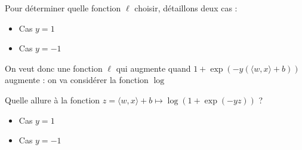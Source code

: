 \documentclass[10pt]{beamer}
\begin{document}
\begin{frame}
	Pour déterminer quelle fonction $\ell$ choisir, détaillons deux cas :\\[1em]
	
	\begin{itemize}
		\item Cas $y=1$\\[10em]
		
		\item Cas $y=-1$\\[9em]
	\end{itemize}
	On veut donc une fonction $\ell$ qui augmente quand $\displaystyle 1+ \exp\left(-y\left(\langle w,x\rangle +b\right)\right)$ augmente : on va considérer la fonction $\log$
\end{frame}



\begin{frame}
Quelle allure à la fonction $z =\langle w,x\rangle +b \mapsto \log\left(1+ \exp\left(-yz\right)\right)$ ?\\[1em]
\begin{itemize}
	\item Cas $y=1$   \\[11em]
	
	\item Cas $y=-1$\\[11em]
\end{itemize}

\end{frame}
\end{document}
